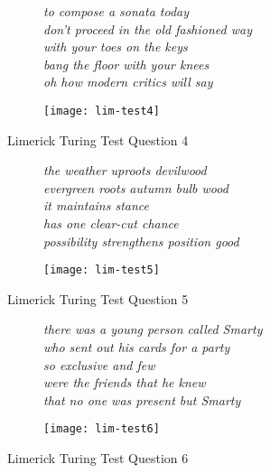 \begin{figure}[H]
\centering
\begin{subfigure}[t!]{0.45\textwidth}
	\centering
    \textit{to compose a sonata today\\don't proceed in the old fashioned way\\with your toes on the keys\\bang the floor with your knees\\oh how modern critics will say}
\end{subfigure}
\begin{subfigure}[t!]{0.45\textwidth}
	\centering
    \texttt{[image: lim-test4]}
\end{subfigure}
\caption{Limerick Turing Test Question 4}
\label{fig:lim-test4}
\end{figure}

\begin{figure}[H]
\centering
\begin{subfigure}[t!]{0.45\textwidth}
	\centering
    \textit{the weather uproots devilwood\\evergreen roots autumn bulb wood\\it maintains stance\\has one clear-cut chance\\possibility strengthens position good}
\end{subfigure}
\begin{subfigure}[t!]{0.45\textwidth}
	\centering
    \texttt{[image: lim-test5]}
\end{subfigure}
\caption{Limerick Turing Test Question 5}
\label{fig:lim-test5}
\end{figure}

\begin{figure}[H]
\centering
\begin{subfigure}[t!]{0.45\textwidth}
	\centering
    \textit{there was a young person called Smarty\\who sent out his cards for a party\\so exclusive and few\\were the friends that he knew\\that no one was present but Smarty}
\end{subfigure}
\begin{subfigure}[t!]{0.45\textwidth}
	\centering
    \texttt{[image: lim-test6]}
\end{subfigure}
\caption{Limerick Turing Test Question 6}
\label{fig:lim-test6}
\end{figure}

